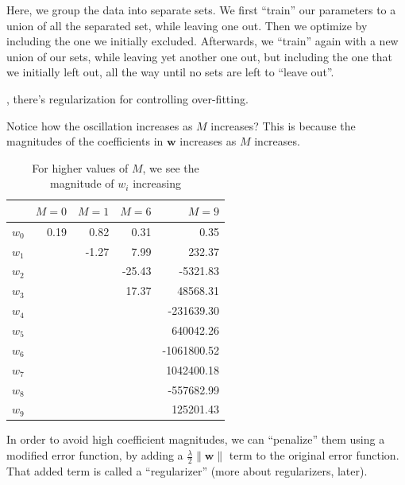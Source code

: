 \documentclass{tufte-handout}
\begin{document}
Here, we group the data into separate sets. We first ``train'' our parameters to a union of all the separated set, while leaving one out. Then we optimize by including the one we initially excluded. Afterwards, we ``train'' again with a new union of our sets, while leaving yet another one out, but including the one that we initially left out, all the way until no sets are left to ``leave out''.

, there's regularization for controlling over-fitting.

Notice how the oscillation increases as $M$ increases? This is because the magnitudes of the coefficients in $\mathbf{w}$ increases as $M$ increases.

\begin{table}[h]
  \begin{center}
    \begin{tabular}{lrrrr}
      \toprule
       & $M = 0$ & $M = 1$ & $M = 6$ & $M = 9$ \\
      \midrule
      $w_0$ & 0.19 &  0.82 &   0.31 &        0.35 \\
      $w_1$ &      & -1.27 &   7.99 &      232.37 \\
      $w_2$ &      &       & -25.43 &    -5321.83 \\
      $w_3$ &      &       &  17.37 &    48568.31 \\
      $w_4$ &      &       &        &  -231639.30 \\
      $w_5$ &      &       &        &   640042.26 \\
      $w_6$ &      &       &        & -1061800.52 \\
      $w_7$ &      &       &        &  1042400.18 \\
      $w_8$ &      &       &        &  -557682.99 \\
      $w_9$ &      &       &        &   125201.43 \\
      \bottomrule
    \end{tabular}
  \end{center}
  \caption{For higher values of $M$, we see the magnitude of $w_i$ increasing}
  \label{tab:font-sizes}
\end{table}

In order to avoid high coefficient magnitudes, we can ``penalize'' them using a modified error function, by adding a $\frac{\lambda}{2}\|\mathbf{w}\|$ term to the original error function. That added term is called a ``regularizer'' (more about regularizers, later).
\end{document}
